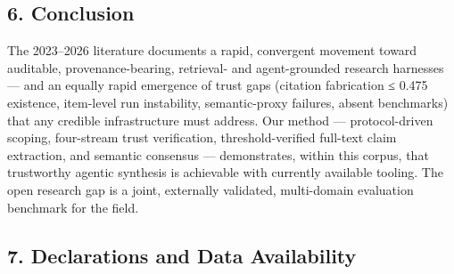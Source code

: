 \documentclass[11pt]{article}
\begin{document}
\subsection{6. Conclusion}\label{conclusion}

The 2023--2026 literature documents a rapid, convergent movement toward
auditable, provenance-bearing, retrieval- and agent-grounded research
harnesses --- and an equally rapid emergence of trust gaps (citation
fabrication ≤ 0.475 existence, item-level run instability,
semantic-proxy failures, absent benchmarks) that any credible
infrastructure must address. Our method --- protocol-driven scoping,
four-stream trust verification, threshold-verified full-text claim
extraction, and semantic consensus --- demonstrates, within this corpus,
that trustworthy agentic synthesis is achievable with currently
available tooling. The open research gap is a joint, externally
validated, multi-domain evaluation benchmark for the field.

\subsection{7. Declarations and Data
Availability}\label{declarations-and-data-availability}
\end{document}
